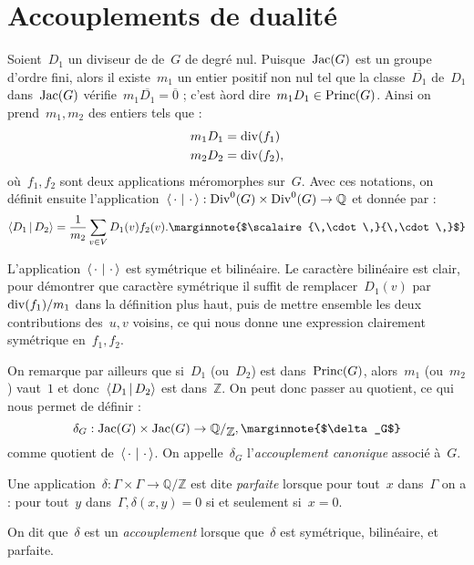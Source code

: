 \section{Accouplements de dualité}
	Soient~$D_1$ un diviseur de de~$G$ de degré nul. Puisque~$\operatorname{Jac}(G)$ est un groupe d'ordre fini, alors il existe~$m_1$ un entier positif non nul tel que la classe~$\overline{D_1}$ de~$D_1$ dans~$\operatorname{Jac}(G)$ vérifie~$m_1 \overline{D_1}=\overline{0}$ ; c'est àord dire~$m_1 D_1 \in \operatorname{Princ}(G)$. Ainsi on prend~$m_1, m_2$ des entiers tels que :
	\begin{align*}
		m_1 D_1 &= \operatorname{div}(f_1)\\
		m_2 D_2 &= \operatorname{div}(f_2),
	\end{align*}
	où~$f_1, f_2$ sont deux applications méromorphes sur~$G$. Avec ces notations, on définit ensuite l'application~$\left<\,\cdot\,\,|\,\,\cdot\,\right> :\operatorname{Div}^0(G)\times\operatorname{Div}^0(G) \rightarrow \mathbb{Q}$ et donnée par :
	\[
		\scalaire{D_1}{D_2} = \frac{1}{m_2} \sum_{v\in V}D_1(v) f_2(v).	\text{\marginnote{$\scalaire{\,\cdot\,}{\,\cdot\,}$}}
	\]
	\begin{rem}
		L'application~$\left<\,\cdot\,\,|\,\,\cdot\,\right>$ est symétrique et bilinéaire. Le caractère bilinéaire est clair, pour démontrer que caractère symétrique il suffit de remplacer~$D_1(v)$ par~$\operatorname{div}(f_1)/m_1$ dans la définition plus haut, puis de mettre ensemble les deux contributions des~$u,v$ voisins, ce qui nous donne une expression clairement symétrique en~$f_1,f_2$.
	\end{rem}
	\begin{rem}
		On remarque par ailleurs que si~$D_1$ (ou~$D_2$) est dans~$\operatorname{Princ}(G)$, alors~$m_1$ (ou~$m_2$) vaut~$1$ et donc~$\left<D_1\,|\,D_2\right>$ est dans~$\mathbb{Z}$. On peut donc passer au quotient, ce qui nous permet de définir :
		\[
			\delta_G : \Jac(G)\times\Jac(G) \rightarrow \quotient{\mathbb{Q}}{\mathbb{Z}}, \text{\marginnote{$\delta_G$}}
		\]
		comme quotient de~$\left<\,\cdot\,\,|\,\,\cdot\,\right>$. On appelle~$\delta_G$ l'\emph{accouplement canonique} associé à~$G$.
	\end{rem}
	\begin{defi}
		Une application~$\delta : \Gamma\times\Gamma \rightarrow \mathbb{Q}/\mathbb{Z}$ est dite \emph{parfaite}  lorsque pour tout~$x$ dans~$\Gamma$ on a : pour tout~$y$ dans~$\Gamma, \delta(x,y) = 0$ si et seulement si~$x = 0$.
		
		On dit que~$\delta$ est un \emph{accouplement}  lorsque que~$\delta$ est symétrique, bilinéaire, et parfaite.
	\end{defi}
